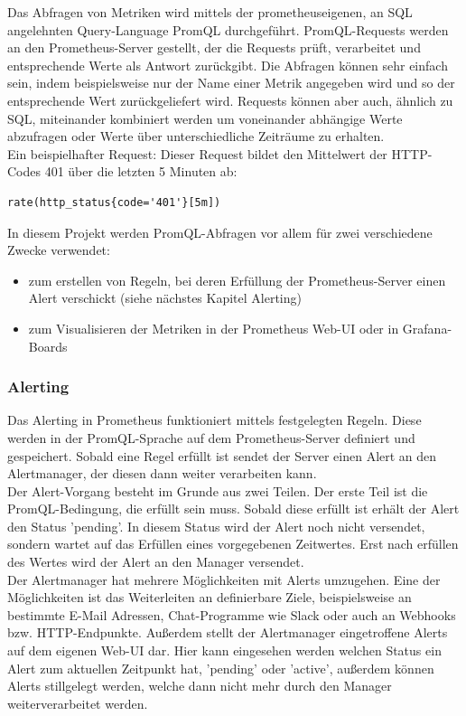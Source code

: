 \documentclass[a4paper,10pt]{scrartcl}
\begin{document}
Das Abfragen von Metriken wird mittels der prometheuseigenen, an SQL angelehnten Query-Language PromQL durchgeführt. PromQL-Requests werden an den Prometheus-Server gestellt, der die Requests prüft, verarbeitet und entsprechende Werte als Antwort zurückgibt. Die Abfragen können sehr einfach sein, indem beispielsweise nur der Name einer Metrik angegeben wird und so der entsprechende Wert zurückgeliefert wird. Requests können aber auch, ähnlich zu SQL, miteinander kombiniert werden um voneinander abhängige Werte abzufragen oder Werte über unterschiedliche Zeiträume zu erhalten.\\

Ein beispielhafter Request:
Dieser Request bildet den Mittelwert der HTTP-Codes 401 über die letzten 5 Minuten ab:
\begin{lstlisting}
rate(http_status{code='401'}[5m])
\end{lstlisting}

In diesem Projekt werden PromQL-Abfragen vor allem für zwei verschiedene Zwecke verwendet:
\begin{itemize}
\item zum erstellen von Regeln, bei deren Erfüllung der Prometheus-Server einen Alert verschickt (siehe nächstes Kapitel Alerting)
\item zum Visualisieren der Metriken in der Prometheus Web-UI oder in Grafana-Boards
\end{itemize}

\subsubsection{Alerting}

Das Alerting in Prometheus funktioniert mittels festgelegten Regeln. Diese werden in der PromQL-Sprache auf dem Prometheus-Server definiert und gespeichert. Sobald eine Regel erfüllt ist sendet der Server einen Alert an den Alertmanager, der diesen dann weiter verarbeiten kann.\\
Der Alert-Vorgang besteht im Grunde aus zwei Teilen. Der erste Teil ist die PromQL-Bedingung, die erfüllt sein muss. Sobald diese erfüllt ist erhält der Alert den Status 'pending'. In diesem Status wird der Alert noch nicht versendet, sondern wartet auf das Erfüllen eines vorgegebenen Zeitwertes. Erst nach erfüllen des Wertes wird der Alert an den Manager versendet.\\

Der Alertmanager hat mehrere Möglichkeiten mit Alerts umzugehen. Eine der Möglichkeiten ist das Weiterleiten an definierbare Ziele, beispielsweise an bestimmte E-Mail Adressen, Chat-Programme wie Slack oder auch an Webhooks bzw. HTTP-Endpunkte. Außerdem stellt der Alertmanager eingetroffene Alerts auf dem eigenen Web-UI dar. Hier kann eingesehen werden welchen Status ein Alert zum aktuellen Zeitpunkt hat, 'pending' oder 'active', außerdem können Alerts stillgelegt werden, welche dann nicht mehr durch den Manager weiterverarbeitet werden.\\
\end{document}
